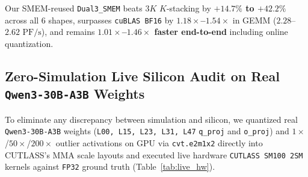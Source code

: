 \documentclass[conference,10pt]{IEEEtran}
\begin{document}
\begin{table}[t]
\centering
\caption{Production Patched \texttt{CUTLASS SM100 2SM} \texttt{Dual-NVFP4} Roofline on Live \texttt{GB200} (Effective Logical \texttt{TFLOPS}; \texttt{E2E} Includes Online \texttt{5.58 TB/s} Quantizer).}
\label{tab:cutlass}
\end{table}

Our SMEM-reused \texttt{Dual3\_SMEM} beats $3K$ $K$-stacking by \textbf{$+14.7\%$ to $+42.2\%$} across all 6 shapes, surpasses \texttt{cuBLAS BF16} by \textbf{$1.18\times$--$1.54\times$} in GEMM ($2.28$--$2.62\text{ PF/s}$), and remains \textbf{$1.01\times$--$1.46\times$ faster end-to-end} including online quantization.

\subsection{Zero-Simulation Live Silicon Audit on Real \texttt{Qwen3-30B-A3B} Weights}
To eliminate any discrepancy between simulation and silicon, we quantized real \texttt{Qwen3-30B-A3B} weights (\texttt{L00, L15, L23, L31, L47} \texttt{q\_proj} and \texttt{o\_proj}) and $1\times$/$50\times$/$200\times$ outlier activations on GPU via \texttt{cvt.e2m1x2} directly into CUTLASS's MMA scale layouts and executed live hardware \texttt{CUTLASS SM100 2SM} kernels against \texttt{FP32} ground truth (Table~\ref{tab:live_hw}).
\end{document}
